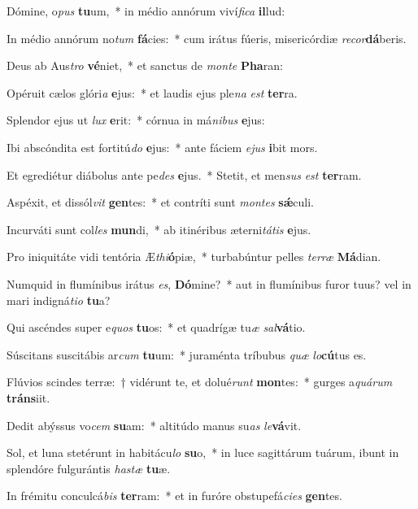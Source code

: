 \item Dómine, o\textit{pus} \textbf{tu}um,~* in médio annórum viví\textit{fi}\textit{ca} \textbf{il}lud:
\item In médio annórum no\textit{tum} \textbf{fá}cies:~* cum irátus fúeris, misericórdiæ \textit{re}\textit{cor}\textbf{dá}beris.
\item Deus ab Aus\textit{tro} \textbf{vé}niet,~* et sanctus de \textit{mon}\textit{te} \textbf{Pha}ran:
\item Opéruit cælos glóri\textit{a} \textbf{e}jus:~* et laudis ejus ple\textit{na} \textit{est} \textbf{ter}ra.
\item Splendor ejus ut \textit{lux} \textbf{e}rit:~* córnua in má\textit{ni}\textit{bus} \textbf{e}jus:
\item Ibi abscóndita est fortitú\textit{do} \textbf{e}jus:~* ante fáciem \textit{e}\textit{jus} \textbf{i}bit mors.
\item Et egrediétur diábolus ante pe\textit{des} \textbf{e}jus.~* Stetit, et men\textit{sus} \textit{est} \textbf{ter}ram.
\item Aspéxit, et dissól\textit{vit} \textbf{gen}tes:~* et contríti sunt \textit{mon}\textit{tes} \textbf{sǽ}culi.
\item Incurváti sunt col\textit{les} \textbf{mun}di,~* ab itinéribus æterni\textit{tá}\textit{tis} \textbf{e}jus.
\item Pro iniquitáte vidi tentória Æ\textit{thi}\textbf{ó}piæ,~* turbabúntur pelles \textit{ter}\textit{ræ} \textbf{Má}dian.
\item Numquid in flumínibus irátus \textit{es}, \textbf{Dó}mine?~* aut in flumínibus furor tuus? vel in mari indigná\textit{ti}\textit{o} \textbf{tu}a?
\item Qui ascéndes super e\textit{quos} \textbf{tu}os:~* et quadrígæ tu\textit{æ} \textit{sal}\textbf{vá}tio.
\item Súscitans suscitábis ar\textit{cum} \textbf{tu}um:~* juraménta tríbubus \textit{quæ} \textit{lo}\textbf{cú}tus es.
\item Flúvios scindes terræ:~† vidérunt te, et dolué\textit{runt} \textbf{mon}tes:~* gurges a\textit{quá}\textit{rum} \textbf{tráns}iit.
\item Dedit abýssus vo\textit{cem} \textbf{su}am:~* altitúdo manus su\textit{as} \textit{le}\textbf{vá}vit.
\item Sol, et luna stetérunt in habitácu\textit{lo} \textbf{su}o,~* in luce sagittárum tuárum, ibunt in splendóre fulgurántis \textit{has}\textit{tæ} \textbf{tu}æ.
\item In frémitu conculcá\textit{bis} \textbf{ter}ram:~* et in furóre obstupefá\textit{ci}\textit{es} \textbf{gen}tes.
